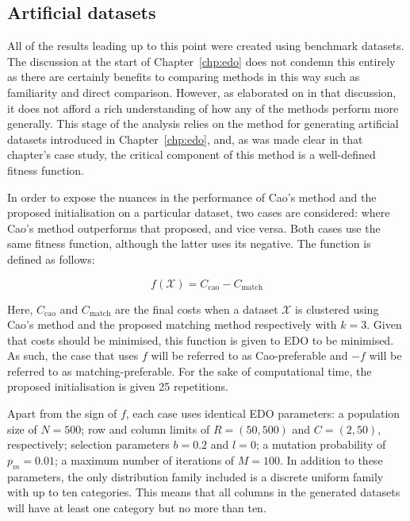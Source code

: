 \subsection{Artificial datasets}\label{subsec:artificial}

All of the results leading up to this point were created using benchmark
datasets. The discussion at the start of Chapter~\ref{chp:edo} does not condemn
this entirely as there are certainly benefits to comparing methods in this way
such as familiarity and direct comparison. However, as elaborated on in that
discussion, it does not afford a rich understanding of how any of the methods
perform more generally. This stage of the analysis relies on the method for
generating artificial datasets introduced in Chapter~\ref{chp:edo}, and, as was
made clear in that chapter's case study, the critical component of this method
is a well-defined fitness function.

In order to expose the nuances in the performance of Cao's method and the
proposed initialisation on a particular dataset, two cases are considered: where
Cao's method outperforms that proposed, and vice versa. Both cases use the same
fitness function, although the latter uses its negative. The function is defined
as follows:

\begin{equation}\label{eq:fitness}
    f\left(\mathcal X\right) = C_{\mathrm{cao}} - C_{\mathrm{match}}
\end{equation}

Here, \(C_{\mathrm{cao}}\) and \(C_{\mathrm{match}}\) are the final costs when a
dataset \(\mathcal X\) is clustered using Cao's method and the proposed matching
method respectively with \(k = 3\). Given that costs should be minimised, this
function is given to EDO to be minimised. As such, the case that uses \(f\) will
be referred to as Cao-preferable and \(-f\) will be referred to as
matching-preferable. For the sake of computational time, the proposed
initialisation is given 25 repetitions.

Apart from the sign of \(f\), each case uses identical EDO parameters: a
population size of \(N = 500\); row and column limits of \(R = (50, 500)\) and
\(C = (2, 50)\), respectively; selection parameters \(b = 0.2\) and \(l = 0\); a
mutation probability of \(p_m = 0.01\); a maximum number of iterations of \(M =
100\). In addition to these parameters, the only distribution family included is
a discrete uniform family with up to ten categories. This means that all columns
in the generated datasets will have at least one category but no more than ten.

